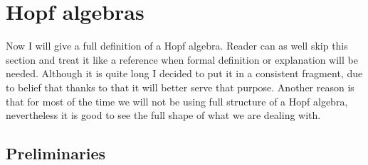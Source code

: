 \documentclass[a4paper, 12pt]{article}
\begin{document}
\section{Hopf algebras}
Now I will give a full definition of a Hopf algebra.
Reader can as well skip this section and treat it like a reference when formal definition or explanation
will be needed. Although it is quite long I decided to put it in a consistent fragment, due to belief
that thanks to that it will better serve that purpose.
Another reason is that for most of the time we will not be using full structure of a Hopf algebra,
nevertheless it is good
to see the full shape of what we are dealing with. \\
\subsection{Preliminaries}
\end{document}
